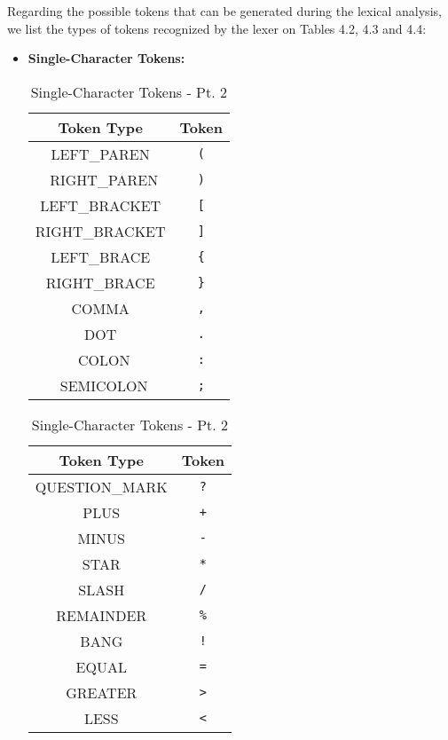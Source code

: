 Regarding the possible tokens that can be generated during the lexical analysis, we list the types of tokens recognized by the lexer on Tables 4.2, 4.3 and 4.4:
\newpage
\begin{itemize}
    \item \textbf{Single-Character Tokens:}

    \begin{table}[h!]
        \centering
        \begin{minipage}{0.45\textwidth}
            \centering
            \begin{tabular}{|c|c|}
                \hline
                \textbf{Token Type} & \textbf{Token} \\
                \hline
                LEFT\_PAREN & \texttt{(} \\ \
                RIGHT\_PAREN & \texttt{)} \\ 
                LEFT\_BRACKET & \texttt{[} \\ 
                RIGHT\_BRACKET & \texttt{]} \\ 
                LEFT\_BRACE & \texttt{\{} \\ 
                RIGHT\_BRACE & \texttt{\}} \\ 
                COMMA & \texttt{,} \\ 
                DOT & \texttt{.} \\ \
                COLON & \texttt{:} \\ \
                SEMICOLON & \texttt{;} \\ 
                \hline
            \end{tabular}
            \caption{Single-Character Tokens - Pt. 1}
        \end{minipage}
        \hfill
        \begin{minipage}{0.45\textwidth}
            \centering
            \begin{tabular}{|c|c|}
                \hline
                \textbf{Token Type} & \textbf{Token} \\
                \hline
                QUESTION\_MARK & \texttt{?} \\ 
                PLUS & \texttt{+} \\ 
                MINUS & \texttt{-} \\ 
                STAR & \texttt{*} \\ 
                SLASH & \texttt{/} \\ 
                REMAINDER & \texttt{\%} \\ 
                BANG & \texttt{!} \\ 
                EQUAL & \texttt{=} \\ 
                GREATER & \texttt{>} \\ 
                LESS & \texttt{<} \\ 
                \hline
            \end{tabular}
            \caption{Single-Character Tokens - Pt. 2}
        \end{minipage}
    \end{table}


\end{itemize}
